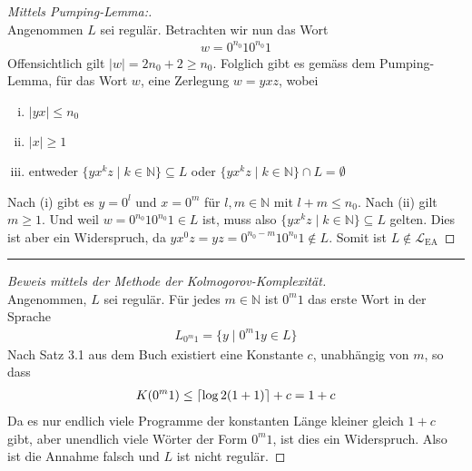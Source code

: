 \documentclass[a4paper,ngerman,12pt]{exam}
\DeclarePairedDelimiter\ceil{\lceil}{\rceil}
\begin{document}
\begin{questions}
\begin{solutionorbox}[22em]
      \begin{proof}[Mittels Pumping-Lemma:] $ $\\
        Angenommen $L$ sei regulär. Betrachten wir nun das Wort
        \begin{align*}
          w = 0^{n_0}10^{n_0}1
        \end{align*}
        Offensichtlich gilt $|w| = 2n_0 + 2 \geq n_0$.
        Folglich gibt es gemäss dem Pumping-Lemma, für das Wort $w$, eine Zerlegung
        $w = yxz$, wobei
        \begin{enumerate}[(i)]
          \item $|yx| \leq n_0$
          \item $|x| \geq 1$
          \item entweder $\{y x^k z \mid k \in \mathbb{N}\} \subseteq L$
            oder $\{y x^k z \mid k \in \mathbb{N}\} \cap L = \emptyset$
        \end{enumerate}
        Nach (i) gibt es $y = 0^l$ und $x = 0^m$ für $l,m \in \mathbb{N}$
        mit $l+m \leq n_0$. Nach (ii) gilt $m \geq 1$. Und weil
        $w = 0^{n_0}10^{n_0}1 \in L$ ist, muss also
        $\{y x^k z \mid k \in \mathbb{N}\} \subseteq L$ gelten. Dies ist aber ein
        Widerspruch, da $yx^0z = yz = 0^{n_0-m}10^{n_0}1 \not\in L$. Somit ist
        $L \not\in \mathcal{L}_{\mathrm{EA}}$
      \end{proof}

      \hrule

      \begin{proof}[Beweis mittels der Methode der Kolmogorov-Komplexität] $ $\\
  Angenommen, $L$ sei regulär. Für jedes $m \in \mathbb{N}$ ist $0^m 1$
  das erste Wort in der Sprache
  \begin{align*}
  L_{0^m 1} = \{y \mid 0^m1y \in L\}
  \end{align*}
Nach Satz 3.1 aus dem Buch existiert eine Konstante $c$, unabhängig von $m$, so dass
  \begin{align*}
  K(0^m 1) \leq \ceil{\log 2 (1 + 1)} + c = 1 + c
  \end{align*}
Da es nur endlich viele Programme der konstanten Länge kleiner gleich $1 + c$ gibt, aber unendlich
viele Wörter der Form $0^m 1$, ist dies ein Widerspruch. Also ist die Annahme falsch
und $L$ ist nicht regulär.
      \end{proof}
    \end{solutionorbox}


\end{questions}
\end{document}
